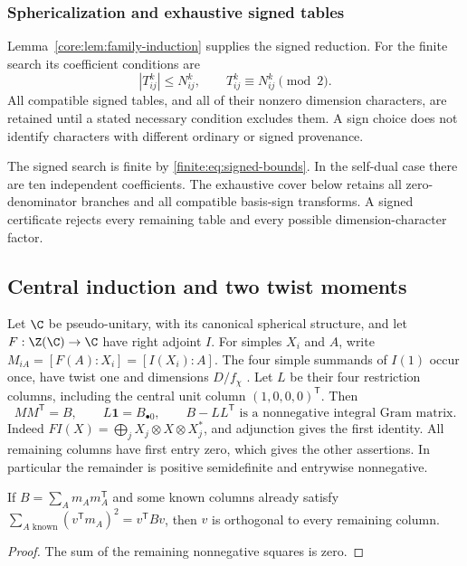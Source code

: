 \subsubsection{Sphericalization and exhaustive signed tables}
Lemma~\ref{core:lem:family-induction} supplies the signed reduction.
For the finite search its coefficient conditions are
\begin{equation}\label{finite:eq:signed-bounds}
 |T_{ij}^{k}|\le N_{ij}^{k},\qquad
 T_{ij}^{k}\equiv N_{ij}^{k}\pmod2.
\end{equation}
All compatible signed tables, and all of their nonzero dimension
characters, are retained until a stated necessary condition excludes
them. A sign choice does not identify characters with different
ordinary or signed provenance.


The signed search is finite by \eqref{finite:eq:signed-bounds}. In the
self-dual case there are ten independent coefficients. The exhaustive
cover below retains all zero-denominator branches and all compatible
basis-sign transforms. A signed certificate rejects every remaining
table and every possible dimension-character factor.


\subsection{Central induction and two twist moments}\label{finite:sec:finite-induction}
Let $\C$ be pseudo-unitary, with its canonical spherical structure,
and let $F:\Z(\C)\to\C$ have right adjoint $I$.
For simples $X_i$ and $A$, write
$M_{iA}=[F(A):X_i]=[I(X_i):A]$. The four simple summands of $I(1)$
occur once, have twist one and dimensions $D/f_\chi$
\cite[Theorems 2.5 and 2.13]{Ostrik3}.
Let $L$ be their four restriction columns, including the central unit
column $(1,0,0,0)^{\mathsf T}$. Then
\begin{equation}\label{finite:eq:induction-gram}
 MM^{\mathsf T}=B,\qquad
 L\mathbf1=B_{\bullet0},\qquad
 B-LL^{\mathsf T}\text{ is a nonnegative integral Gram matrix}.
\end{equation}
Indeed $FI(X)=\bigoplus_j X_j\otimes X\otimes X_j^*$, and adjunction
gives the first identity. All remaining columns have first entry zero,
which gives the other assertions. In particular the remainder is positive
semidefinite and entrywise nonnegative.

\begin{lemma}\label{finite:lem:gram-saturation}
If $B=\sum_A m_Am_A^{\mathsf T}$ and some known columns already
satisfy $\sum_{A\text{ known}}(v^{\mathsf T}m_A)^2=v^{\mathsf T}Bv$,
then $v$ is orthogonal to every remaining column.
\end{lemma}
\begin{proof}
The sum of the remaining nonnegative squares is zero.
\end{proof}

